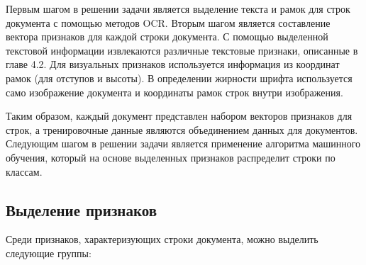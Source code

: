\documentclass{ProcISPRAS}
\begin{document}
Первым шагом в решении задачи является выделение текста и рамок для строк документа с помощью методов OCR. Вторым шагом является составление вектора признаков для каждой строки документа. С помощью выделенной текстовой информации извлекаются различные текстовые признаки, описанные в главе 4.2. Для визуальных признаков используется информация из координат рамок (для отступов и высоты). В определении жирности шрифта используется само изображение документа и координаты рамок строк внутри изображения.

Таким образом, каждый документ представлен набором векторов признаков для строк, а тренировочные данные являются объединением данных для документов.
Следующим шагом в решении задачи является применение алгоритма машинного обучения, который на основе выделенных признаков распределит строки по классам.

\subsection{Выделение признаков}

Среди признаков, характеризующих строки документа, можно выделить следующие группы:
\end{document}
